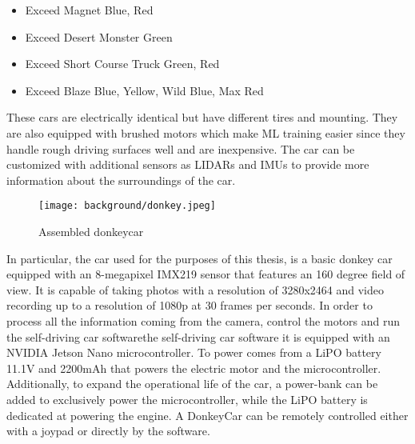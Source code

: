 \begin{itemize}
  \item Exceed Magnet Blue, Red
  \item Exceed Desert Monster Green
  \item Exceed Short Course Truck Green, Red
  \item Exceed Blaze Blue, Yellow, Wild Blue, Max Red
\end{itemize}

These cars are electrically identical but have different tires and mounting. They are also equipped with brushed motors which make ML training easier since they handle rough driving surfaces well and are inexpensive. The car can be customized with additional sensors as LIDARs and IMUs to provide more information about the surroundings of the car.

\begin{wrapfigure}[19]{r}{0.5\textwidth}
  \begin{center}
    \texttt{[image: background/donkey.jpeg]}
  \end{center}
  \caption{Assembled donkeycar}
  \label{fig:donkey}
\end{wrapfigure}

In particular, the car used for the purposes of this thesis, is a basic donkey car equipped with an 8-megapixel IMX219 sensor that features an 160 degree field of view. It is capable of taking photos with a resolution of 3280x2464 and video recording up to a resolution of 1080p at 30 frames per seconds. In order to process all the information coming from the camera, control the motors and run the self-driving car softwarethe self-driving car software it is equipped with an NVIDIA Jetson Nano microcontroller. To power comes from a LiPO battery 11.1V and 2200mAh that powers the electric motor and the microcontroller. Additionally, to expand the operational life of the car, a power-bank can be added to exclusively power the microcontroller, while the LiPO battery is dedicated at powering the engine. 
A DonkeyCar can be remotely controlled either with a joypad or directly by the software.